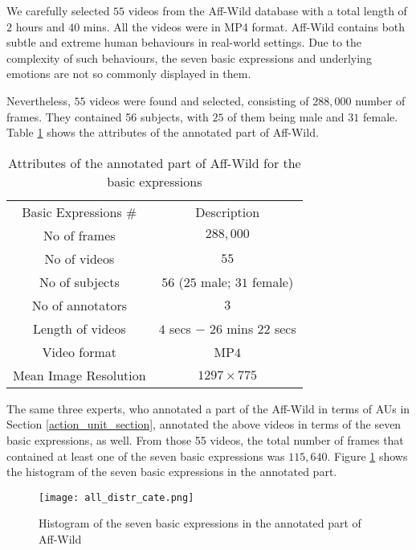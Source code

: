 \documentclass[a4paper, 10pt, conference]{ieeeconf}      %
\begin{document}
We carefully selected $55$ videos from the Aff-Wild database with a total length of $2$ hours and $40$ mins. All the videos were in MP4 format.
Aff-Wild contains both subtle and extreme human behaviours in real-world settings. Due to the complexity of such behaviours, the seven basic expressions and underlying emotions are not so commonly displayed in them. 
 


Nevertheless, $55$ videos were found and selected, consisting of $288,000$ number of frames. They contained 56 subjects, with $25$ of them being male and $31$ female. Table \ref{attrs2} shows the attributes of the annotated part of Aff-Wild. 


\begin{table}[h]
\caption{Attributes of the annotated part of Aff-Wild for the basic expressions}
\label{attrs2}
\centering
\begin{tabular}{|c|c|}
\hline
Basic Expressions \# & Description \\ 
\hhline{|=|=|}
No of frames  & $288,000$ \\
\hline
No of videos & $55$ \\
\hline
No of subjects  & $56$ ($25$ male; $31$ female)  \\
\hline
No of annotators  & $3$ \\
\hline
Length of videos & $4$ secs $-$ $26$ mins $22$ secs  \\
\hline
Video format & MP$4$\\
\hline
Mean Image Resolution & $1297 \times 775 $\\
\hline
\end{tabular}
\end{table}

The same three experts, who annotated a part of the Aff-Wild in terms of AUs in Section \ref{action_unit_section}, annotated the above videos in terms of the seven basic expressions, as well.
From those 55 videos, the total number of frames that contained at least one of the seven basic expressions was $115,640$. Figure \ref{tab:frame_number_basic_expr} shows the histogram of the seven basic expressions in the annotated part.


\begin{figure}[h]
\centering
\texttt{[image: all\_distr\_cate.png]}
\caption{Histogram of the seven basic expressions in the annotated part of Aff-Wild}
\label{tab:frame_number_basic_expr}
\vskip -0.2cm
\end{figure}
\end{document}
